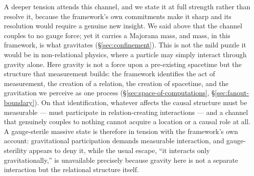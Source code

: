 A deeper tension attends this channel, and we state it at full strength rather than resolve it,
because the framework's own commitments make it sharp and its resolution would require a genuine new
insight. We said above that the channel couples to no gauge force; yet it carries a Majorana mass, and mass,
in this framework, is what gravitates (\S\ref{sec:confinement}). This is not the mild puzzle it would
be in non-relational physics, where a particle may simply interact through gravity alone. Here
gravity is not a force upon a pre-existing spacetime but the structure that measurement builds: the
framework identifies the act of measurement, the creation of a relation, the creation of spacetime,
and the gravitation we perceive as one process (\S\ref{sec:space-of-computations},
\S\ref{sec:fanout-boundary}). On that identification, whatever affects the causal structure must be
measurable --- must participate in relation-creating interactions --- and a channel that genuinely
couples to nothing cannot acquire a location or a causal role at all. A gauge-sterile massive state
is therefore in tension with the framework's own account: gravitational participation demands
measurable interaction, and gauge-sterility appears to deny it, while the usual escape, ``it
interacts only gravitationally,'' is unavailable precisely because gravity here is not a separate
interaction but the relational structure itself.

